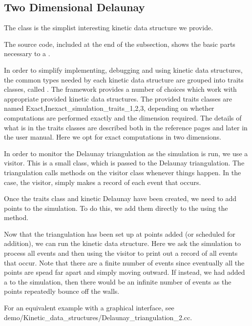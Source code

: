 

\subsection{Two Dimensional Delaunay}
\label{sec:delaunay_2_example}

The  class is the simplist
interesting kinetic data structure we provide. 

The source code, included at the end of the subsection, shows the
basic parts necessary to a .

In order to simplify implementing, debugging and using kinetic data
structures, the common types needed by each kinetic data structure are
grouped into traits classes, called . The
framework provides a number of choices which work with appropriate
provided kinetic data structures. The provided traits classes are
named {Exact,Inexact}\_simulation\_traits\_{1,2,3}, depending on
whether computations are performed exactly and the dimension
required. The details of what is in the traits classes are described
both in the
 reference pages and later in the user manual. Here we opt for exact computations in two dimensions.

In order to monitor the Delaunay triangulation as the simulation is
run, we use a visitor. This is a small class, which is passed to the
Delaunay triangulation. The triangulation calls methods on the visitor
class whenever things happen. In the case, the visitor,
 simply makes a record of each event that occurs.

Once the traits class and kinetic Delaunay have been created, we need
to add points to the simulation. To do this, we add them directly to
the
 using the  method. 


Now that the triangulation has been set up at points added (or
scheduled for addition), we can run the kinetic data structure. Here
we ask the simulation to process all events and then using the visitor
to print out a record of all events that occur. Note that there are a
finite number of events since eventually all the points are spead far
apart and simply moving outward. If instead, we had added a
 to the simulation, then 
there would be an infinite number of events as the points repeatedly
bounce off the walls.

For an equivalent example with a graphical interface, see
demo/Kinetic\_data\_structures/Delaunay\_triangulation\_2.cc.

\label{fig:delaunay_2_usage_program}
